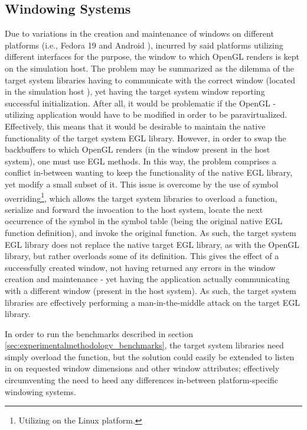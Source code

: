 \subsection{Windowing Systems}
\label{sec:proposedsolutionandimplementation_windowingsystems}
Due to variations in the creation and maintenance of windows on different platforms (i.e., Fedora 19 and Android ), incurred by said platforms utilizing different interfaces for the purpose, the window to which OpenGL renders is kept on the simulation host.
The problem may be summarized as the dilemma of the target system libraries having to communicate with the correct window (located in the simulation host ), yet having the target system window reporting successful initialization.
After all, it would be problematic if the OpenGL -utilizing application would have to be modified in order to be paravirtualized.
Effectively, this means that it would be desirable to maintain the native functionality of the target system EGL library.
However, in order to swap the backbuffers to which OpenGL renders (in the window present in the host system), one must use EGL methods.
In this way, the problem comprises a conflict in-between wanting to keep the functionality of the native EGL library, yet modify a small subset of it. 
This issue is overcome by the use of symbol overriding\footnote{Utilizing  on the Linux platform.}, which allows the target system libraries to overload a function, serialize and forward the invocation to the host system, locate the next occurrence of the symbol in the symbol table (being the original native EGL function definition), and invoke the original function.
As such, the target system EGL library does not replace the native target EGL library, as with the OpenGL library, but rather overloads some of its definition.
This gives the effect of a successfully created window, not having returned any errors in the window creation and maintenance - yet having the application actually communicating with a different window (present in the host system).
As such, the target system libraries are effectively performing a man-in-the-middle attack on the target EGL library.

In order to run the benchmarks described in section \ref{sec:experimentalmethodology_benchmarks}, the target system libraries need simply overload the  function, but the solution could easily be extended to listen in on requested window dimensions and other window attributes; effectively circumventing the need to heed any differences in-between platform-specific windowing systems.

